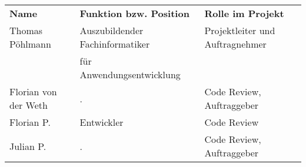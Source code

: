 \begin{tabu}{lll}
\rowfont{\bfseries\leavevmode\color{headingfont}}\textbf{Name} & \textbf{Funktion bzw. Position} & \textbf{Rolle im Projekt} \\
Thomas Pöhlmann & Auszubildender Fachinformatiker & Projektleiter und Auftragnehmer \\
& für Anwendungsentwicklung & \\
Florian von der Weth & . & Code Review, Auftraggeber \\
Florian P. & Entwickler & Code Review \\
Julian P. & . & Code Review, Auftraggeber \\
\end{tabu}